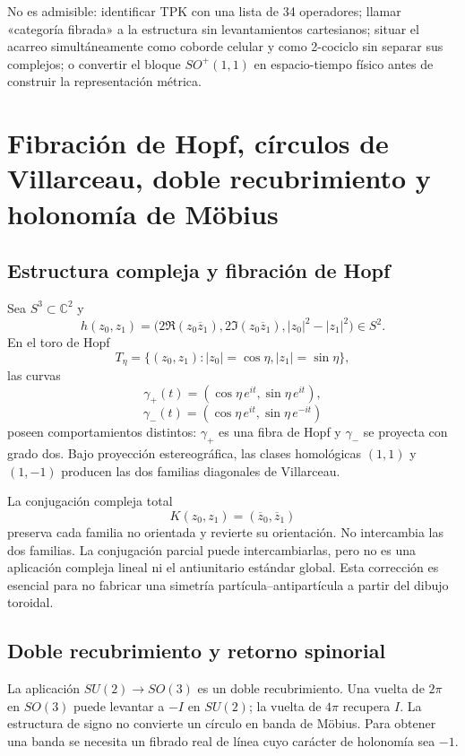 \begin{falsadorBox}[title={Controles de tipo}]
No es admisible: identificar TPK con una lista de 34 operadores; llamar
«categoría fibrada» a la estructura sin levantamientos cartesianos; situar el
acarreo simultáneamente como coborde celular y como 2-cociclo sin separar sus
complejos; o convertir el bloque \(SO^+(1,1)\) en espacio-tiempo físico antes
de construir la representación métrica.
\end{falsadorBox}


\section{Fibración de Hopf, círculos de Villarceau, doble recubrimiento y holonomía de Möbius}

\subsection{Estructura compleja y fibración de Hopf}

Sea \(S^3\subset\mathbb C^2\) y
\[
h(z_0,z_1)=
\bigl(2\Re(z_0\overline z_1),
2\Im(z_0\overline z_1),|z_0|^2-|z_1|^2\bigr)
\in S^2.
\]
En el toro de Hopf
\[
T_\eta=\{(z_0,z_1):|z_0|=\cos\eta,
|z_1|=\sin\eta\},
\]
las curvas
\[
\gamma_+(t)=(\cos\eta\,e^{it},\sin\eta\,e^{it}),
\]
\[
\gamma_-(t)=(\cos\eta\,e^{it},\sin\eta\,e^{-it})
\]
poseen comportamientos distintos: \(\gamma_+\) es una fibra de Hopf y
\(\gamma_-\) se proyecta con grado dos. Bajo proyección estereográfica, las
clases homológicas \((1,1)\) y \((1,-1)\) producen las dos familias diagonales
de Villarceau.

La conjugación compleja total
\[
K(z_0,z_1)=(\overline z_0,\overline z_1)
\]
preserva cada familia no orientada y revierte su orientación. No intercambia
las dos familias. La conjugación parcial puede intercambiarlas, pero no es una
aplicación compleja lineal ni el antiunitario estándar global. Esta corrección
es esencial para no fabricar una simetría partícula--antipartícula a partir del
dibujo toroidal.

\subsection{Doble recubrimiento y retorno spinorial}

La aplicación \(SU(2)\to SO(3)\) es un doble recubrimiento. Una vuelta de
\(2\pi\) en \(SO(3)\) puede levantar a \(-I\) en \(SU(2)\); la vuelta de
\(4\pi\) recupera \(I\). La estructura de signo no convierte un círculo en
banda de Möbius. Para obtener una banda se necesita un fibrado real de línea
cuyo carácter de holonomía sea \(-1\).

